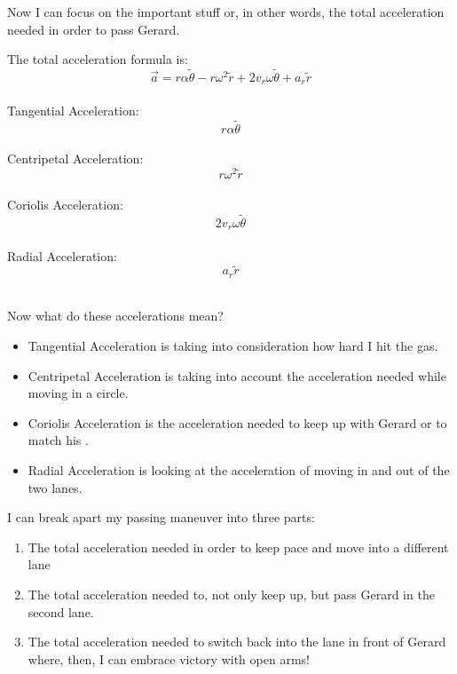 \documentclass[a4paper, 11pt]{article} %
\begin{document}
\begin{flushleft}
Now I can focus on the important stuff or, in other words, the total acceleration needed in order to pass Gerard.\newline


\centering The total acceleration formula is: 
$$\overrightarrow{a}= r\alpha \tilde{\theta}-r\omega^2 \tilde{r}+ 2v_r \omega \tilde{\theta}+ a_r \tilde{r}$$\\


Tangential Acceleration: $$r\alpha \tilde{\theta}$$\\
Centripetal Acceleration: $$r\omega^2 \tilde{r}$$\\
Coriolis Acceleration: $$2v_r \omega \tilde{\theta}$$\\
Radial Acceleration: $$a_r \tilde{r}$$\\
\begin{flushleft}

Now what do these accelerations mean?\\
\begin{itemize}
\item Tangential Acceleration is taking into consideration how hard I hit the gas.\\
\item Centripetal Acceleration is taking into account the acceleration needed while moving in a circle.\\
\item Coriolis Acceleration is the acceleration needed to keep up with Gerard or to match his \omega.\\
\item Radial Acceleration is looking at the acceleration of moving in and out of the two lanes.\\
\end{itemize}

I can break apart my passing maneuver into three parts:\\
\begin{enumerate}
\item The total acceleration needed in order to keep pace and move into a different lane 
\item The total acceleration needed to, not only keep up, but pass Gerard in the second lane.
\item The total acceleration needed to switch back into the lane in front of Gerard where, then, I can embrace victory with open arms! 
\end{enumerate}



\end{flushleft}
\end{flushleft}
\end{document}

